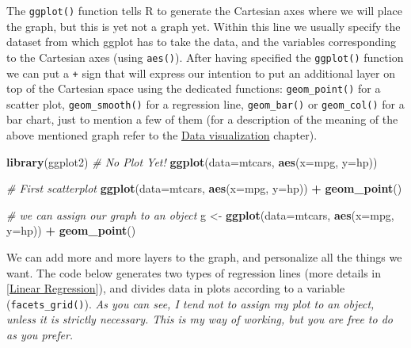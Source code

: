 \documentclass[
]{svmono}
\newenvironment{Shaded}{\begin{snugshade}}{\end{snugshade}}
\newcommand{\AttributeTok}[1]{\textcolor[rgb]{0.13,0.29,0.53}{#1}}
\newcommand{\CommentTok}[1]{\textcolor[rgb]{0.56,0.35,0.01}{\textit{#1}}}
\newcommand{\FunctionTok}[1]{\textcolor[rgb]{0.13,0.29,0.53}{\textbf{#1}}}
\newcommand{\NormalTok}[1]{#1}
\newcommand{\OtherTok}[1]{\textcolor[rgb]{0.56,0.35,0.01}{#1}}
\newcommand{\SpecialCharTok}[1]{\textcolor[rgb]{0.81,0.36,0.00}{\textbf{#1}}}
\begin{document}
The \texttt{ggplot()} function tells R to generate the Cartesian axes where we
will place the graph, but this is yet not a graph yet. Within this line
we usually specify the dataset from which ggplot has to take the data,
and the variables corresponding to the Cartesian axes (using \texttt{aes()}).
After having specified the \texttt{ggplot()} function we can put a \texttt{+} sign
that will express our intention to put an additional layer on top of the
Cartesian space using the dedicated functions: \texttt{geom\_point()} for a
scatter plot, \texttt{geom\_smooth()} for a regression line, \texttt{geom\_bar()} or
\texttt{geom\_col()} for a bar chart, just to mention a few of them (for a
description of the meaning of the above mentioned graph refer to the
\protect\hyperlink{data-visualization}{Data visualization} chapter).

\begin{Shaded}
\begin{Highlighting}[]
\FunctionTok{library}\NormalTok{(ggplot2)}
\CommentTok{\# No Plot Yet!}
\FunctionTok{ggplot}\NormalTok{(}\AttributeTok{data=}\NormalTok{mtcars, }\FunctionTok{aes}\NormalTok{(}\AttributeTok{x=}\NormalTok{mpg, }\AttributeTok{y=}\NormalTok{hp))}

\CommentTok{\# First scatterplot}
\FunctionTok{ggplot}\NormalTok{(}\AttributeTok{data=}\NormalTok{mtcars, }\FunctionTok{aes}\NormalTok{(}\AttributeTok{x=}\NormalTok{mpg, }\AttributeTok{y=}\NormalTok{hp)) }\SpecialCharTok{+} 
  \FunctionTok{geom\_point}\NormalTok{()}

\CommentTok{\# we can assign our graph to an object}
\NormalTok{g }\OtherTok{\textless{}{-}} \FunctionTok{ggplot}\NormalTok{(}\AttributeTok{data=}\NormalTok{mtcars, }\FunctionTok{aes}\NormalTok{(}\AttributeTok{x=}\NormalTok{mpg, }\AttributeTok{y=}\NormalTok{hp)) }\SpecialCharTok{+} 
  \FunctionTok{geom\_point}\NormalTok{()}
\end{Highlighting}
\end{Shaded}

We can add more and more layers to the graph, and personalize all the
things we want. The code below generates two types of regression lines
(more details in {[}\protect\hyperlink{linear-regression}{Linear Regression}{]}), and divides data in plots
according to a variable (\texttt{facets\_grid()}). \emph{As you can see, I tend not
to assign my plot to an object, unless it is strictly necessary. This is
my way of working, but you are free to do as you prefer.}
\end{document}
